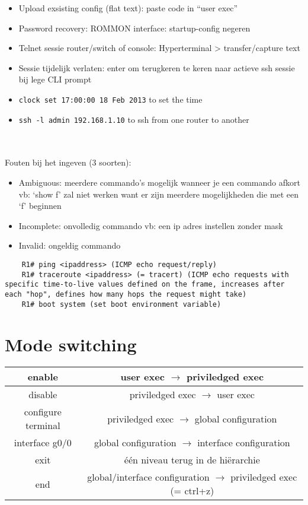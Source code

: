 \documentclass[10pt, a4paper]{article}
\begin{document}
	\begin{itemize}[noitemsep,nolistsep]
		\item Upload exsisting config (flat text): paste code in ``user exec''
		\item Password recovery: ROMMON interface: startup-config negeren
		\item Telnet sessie router/switch of console: Hyperterminal > transfer/capture text
		\item Sessie tijdelijk verlaten: enter om terugkeren te keren naar actieve ssh sessie bij lege CLI prompt
		\item \texttt{clock set 17:00:00 18 Feb 2013} to set the time
		\item \texttt{ssh -l admin 192.168.1.10} to ssh from one router to another\\
	\end{itemize}
	\ \\ \\

	Fouten bij het ingeven (3 soorten):
	\begin{itemize}[noitemsep,nolistsep]
		\item Ambiguous: meerdere commando's mogelijk wanneer je een commando afkort vb: `show f' zal niet werken want er zijn meerdere mogelijkheden die met een `f' beginnen
		\item Incomplete: onvolledig commando vb: een ip adres instellen zonder mask
		\item Invalid: ongeldig commando\\
	\end{itemize}

	\begin{lstlisting}
	R1# ping <ipaddress> (ICMP echo request/reply)
	R1# traceroute <ipaddress> (= tracert) (ICMP echo requests with specific time-to-live values defined on the frame, increases after each "hop", defines how many hops the request might take)
	R1# boot system (set boot environment variable)
	\end{lstlisting}

	\section{Mode switching}
	\begin{tabular}{|c|c|}
		\hline \rule[-1ex]{0pt}{4ex} enable & user exec $\rightarrow$ priviledged exec  \\
		\hline \rule[-1ex]{0pt}{4ex} disable  & priviledged exec $\rightarrow$ user exec \\
		\hline \rule[-1ex]{0pt}{4ex} configure terminal & priviledged exec $\rightarrow$ global configuration \\
		\hline \rule[-1ex]{0pt}{4ex} interface g0/0 & global configuration $\rightarrow$ interface configuration \\
		\hline \rule[-1ex]{0pt}{4ex} exit & \'{e}\'{e}n niveau terug in de hi\"erarchie\\
		\hline \rule[-1ex]{0pt}{4ex} end & global/interface configuration $\rightarrow$ priviledged exec (= ctrl+z)  \\
		\hline
	\end{tabular} \\
\end{document}
